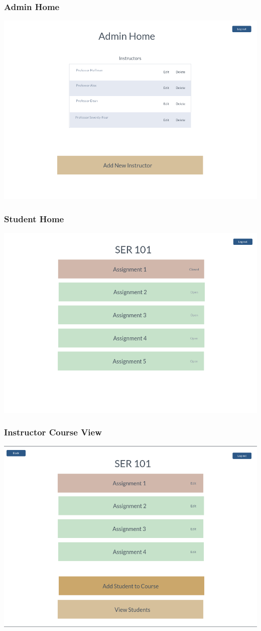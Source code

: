 \documentclass{article}
\begin{document}
\subsubsection{Admin Home}
\includegraphics[width=0.8\linewidth]{AdminHome.png}

\subsubsection{Student Home}
\includegraphics[width=0.8\linewidth]{StudentHome.png}

\subsubsection{Instructor Course View}
\includegraphics[width=0.8\linewidth]{InstructorCourseView.png}
\end{document}
